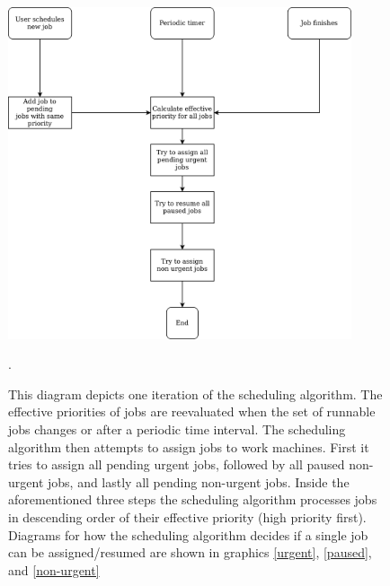 \begin{figure}
  \centering
  \includegraphics[width=0.9\textwidth]{./customer/diagrams/png/main-idea.png}
  \caption{This diagram depicts one iteration of the scheduling algorithm.
    The effective priorities of jobs are reevaluated when the set of runnable jobs changes or after a periodic time interval.
    The scheduling algorithm then attempts to assign jobs to work machines.
    First it tries to assign all pending urgent jobs, followed by all paused non-urgent jobs, and lastly all pending non-urgent jobs.
    Inside the aforementioned three steps the scheduling algorithm processes jobs in descending order of their effective priority (high priority first).
    Diagrams for how the scheduling algorithm decides if a single job can be assigned/resumed are shown in graphics \ref{urgent}, \ref{paused}, and \ref{non-urgent}}.
  \label{high-level}
\end{figure}
